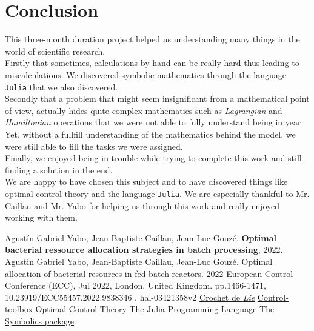 \documentclass{tudelft-report}
\begin{document}
\chapter{Conclusion}
\label{chapter:conclusion}
This three-month duration project helped us understanding many things in the world of scientific research.\\
Firstly that sometimes, calculations by hand can be really hard thus leading to miscalculations. We discovered symbolic mathematics through the language \verb|Julia| that we also discovered.\\
Secondly that a problem that might seem insignificant from a mathematical point of view, actually hides quite complex mathematics such as \textit{Lagrangian} and \textit{Hamiltonian} operations that we were not able to fully understand being in  year. Yet, without a fullfill understanding of the mathematics behind the model, we were still able to fill the tasks we were assigned.\\
Finally, we enjoyed being in trouble while trying to complete this work and still finding a solution in the end.\\
We are happy to have chosen this subject and to have discovered things like optimal control theory and the language \verb|Julia|. We are especially thankful to Mr. Caillau and Mr. Yabo for helping us through this work and really enjoyed working with them.
 \setcounter{biburlnumpenalty}{7000}
 \setcounter{biburllcpenalty}{7000}
 \setcounter{biburlucpenalty}{7000}
 \printbibliography[heading=bibintoc,title=References]
\appendix

\begin{thebibliography}{}
    Agustín Gabriel Yabo, Jean-Baptiste Caillau, Jean-Luc Gouzé. \textbf{Optimal bacterial ressource allocation strategies
in batch processing}, 2022.
Agustin Gabriel Yabo, Jean-Baptiste Caillau, Jean-Luc Gouzé. Optimal allocation of bacterial resources in fed-batch reactors. 2022 European Control Conference (ECC), Jul 2022, London, United
Kingdom. pp.1466-1471, 10.23919/ECC55457.2022.9838346 . hal-03421358v2
    \href{https://fr.wikipedia.org/wiki/Crochet_de_Lie}{Crochet de \textit{Lie}}
    \href{https://control-toolbox.org/}{Control-toolbox}
    \href{https://en.wikipedia.org/wiki/Optimal_control}{Optimal Control Theory}
    \href{https://julialang.org/}{The Julia Programming Language}
    \href{https://symbolics.juliasymbolics.org/stable/}{The Symbolics package}
\end{thebibliography}
\end{document}
